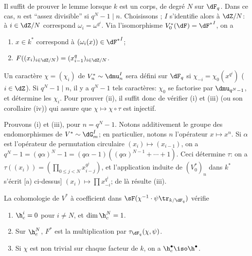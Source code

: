 Il suffit de prouver le lemme lorsque $k$ est un corps, de degré $N$ sur 
$\dF_q$. Dans ce cas, $n$ est ``assez divisible'' si $q^N-1\mid n$. 
Choisissons ; $I$ s'identifie alors 
à $\dZ/N$: à $i\in \dZ/N$ correspond $\omega_i=\omega^{q^i}$. Via 
l'isomorphisme $V_0^\ast(\dF) = {\dF^\ast}^I$, on a 
\begin{enumerate}[\indent a)]
  \item $x\in k^\ast$ correspond à $(\omega_i(x))\in {\dF^\ast}^I$; 
  \item $F((x_i)_{i\in \dZ/N})=(x_{i-1}^q)_{i\in \dZ/N}$. 
\end{enumerate}

Un caractère $\chi=(\chi_i)$ de $V_n^\ast\sim \dmu_n^I$ sera défini sur 
$\dF_q$ si $\chi_{-i} =\chi_0(x^{q^i})$ ($i\in \dZ$). Si $q^N-1\mid n$, il y a 
$q^N-1$ tels caractères: $\chi_0$ se factorise par $\dmu_{q^N-1}$, et 
détermine les $\chi_i$. Pour prouver (ii), il suffit donc de vérifier (i) 
et (iii) (ou son corollaire (iv)) qui assure que $\chi\mapsto \chi\circ \tau$ 
est injectif. 

Prouvons (i) et (iii), pour $n=q^N-1$. Notons additivement le groupe des 
endomorphismes de $V^\ast\sim \dG_m^I$; en particulier, notons $n$ 
l'opérateur $x\mapsto x^n$. Si $\alpha$ est l'opérateur de permutation 
circulaire $(x_i)\mapsto (x_{i-1})$, on a 
$q^N-1=(q\alpha)^N-1 = (q\alpha-1)((q\alpha)^{N-1}+\cdots + 1)$. Ceci 
détermine $\tau$: on a $\tau((x_i)) = (\prod_{0\leqslant j<N} x_{i-j}^{q^j})$, 
et l'application induite de $(V_0^\ast)_n$ dans $k^\ast$ s'écrit [a) 
ci-dessus] $(x_i)\mapsto \prod x_{-i}^{q^i}$; de là résulte (iii). 





\begin{proposition_}\label{VI:4-10}
La cohomologie de $V^\ast$ à coefficient dans 
$\sF(\chi^{-1}\cdot \psi\tr_{k/\dF_q})$ vérifie 
\begin{enumerate}[\indent (i)]
  \item $\h_c^i = 0$ pour $i\ne N$, et $\dim \h_c^N=1$. 
  \item Sur $\h_c^N$, $F^\ast$ est la multiplication par 
    $\tau_{\dF_q}(\chi,\psi)$. 
  \item Si $\chi$ est non trivial sur chaque facteur de $k$, on a 
    $\h_c^\bullet \iso \h^\bullet$. 
\end{enumerate}
\end{proposition_}


